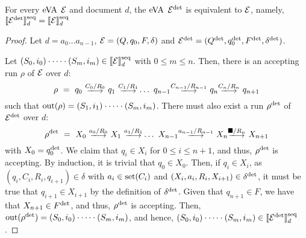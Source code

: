 \begin{proposition}\label{prop:eVAdet} For every $\mathrm{eVA}$ $\mathcal{E}$ and document $d$,
	the $\mathrm{eVA}$ $\mathcal{E}^{{\operatorname{det}}}$ is equivalent to $\mathcal{E}$, namely,
	$\llbracket\mathcal{E}^{{\operatorname{det}}}\rrbracket^{\operatorname{seq}}_d = \llbracket\mathcal{E}\rrbracket^{\operatorname{seq}}_d$
\end{proposition}
\begin{proof}
	Let $d=a_0\ldots a_{n-1}$, $\mathcal{E} = (Q, q_0, F, \delta)$ and $\mathcal{E}^{{\operatorname{det}}} =
		(Q^{{\operatorname{det}}},q_0^{{\operatorname{det}}}, F^{{\operatorname{det}}}, \delta^{{\operatorname{det}}})$.

	Let $(S_0, i_0)\cdot \cdots \cdot(S_m, i_m) \in \llbracket\mathcal{E}\rrbracket^{\operatorname{seq}}_d$ with $0 \leq
		m \leq n$. Then, there is an accepting run $\rho$ of $\mathcal{E}$ over $d$:
	$$
		\rho \ = \ q_0 \ \longtrans{C_0 / R_0} \ q_1 \ \longtrans{C_1 / R_1}  \ldots \ q_{n-1} \longtrans{C_{n-1} / R_{n-1}} \ q_{n} \longtrans{C_n / R_n} \ q_{n+1}
	$$
	such that $\operatorname{out}(\rho) = (S_1, i_1)\cdot \cdots \cdot(S_m, i_m)$. There must
	also exist a run $\rho^{{\operatorname{det}}}$ of $\mathcal{E}^{{\operatorname{det}}}$ over $d$:
	$$
		\rho^{\odet} \ = \ X_0 \ \longtrans{a_0 / R_0} \ X_1 \ \longtrans{a_1 / R_1}  \ldots \ X_{n-1} \longtrans{a_{n-1} / R_{n-1}} \ X_{n} \longtrans{\osymbol / R_n} \ X_{n+1}
	$$
	with $X_0 = q_0^{{\operatorname{det}}}$. We claim that $q_i \in X_i$ for $0 \leq i \leq n +
		1$, and thus, $\rho^{{\operatorname{det}}}$ is accepting. By induction, it is trivial
		that $q_0 \in X_0$. Then, if $q_i \in X_i$, as $(q_i, C_i, R_i, q_{i+1})
		\in \delta$ with $a_i \in \operatorname{set}(C_i)$ and $(X_i, a_i, R_i, X_{i+1}) \in
		\delta^{{\operatorname{det}}}$, it must be true that $q_{i+1} \in X_{i+1}$ by the
		definition of $\delta^{\operatorname{det}}$. Given that $q_{n+1} \in F$, we have that
		$X_{n+1} \in F^{{\operatorname{det}}}$, and thus, $\rho^{{\operatorname{det}}}$ is accepting. Then,
		$\operatorname{out}(\rho^{{\operatorname{det}}}) = (S_0, i_0)\cdot \cdots \cdot(S_m, i_m)$, and
		hence, $(S_0, i_0)\cdot \cdots \cdot(S_m, i_m) \in
		\llbracket\mathcal{E}^{{\operatorname{det}}}\rrbracket^{\operatorname{seq}}_d$.


\end{proof}
